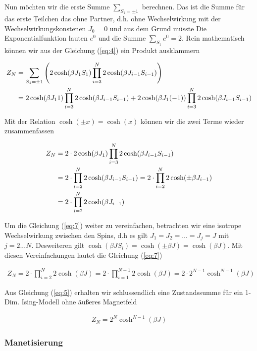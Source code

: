 Nun möchten wir die erste Summe \(\sum_{S_1=\pm 1}\) berechnen. Das ist die Summe für das erste Teilchen das ohne Partner, d.h. ohne Wechselwirkung mit der Wechselwirkungskonstenen \(J_0=0\) und aus dem Grund müsste Die Exponentialfunktion lauten \(e^0\) und die Summe \(\sum_{S_1}e^0 = 2\). Rein mathematisch können wir aus der Gleichung (\ref{eq:4}) ein Produkt ausklammern

\begin{align}
  \label{eq:6}
   Z_N &=\sum_{S_1=\pm 1}\left( 2\cosh(\beta J_1 S_1) \prod_{i=3}^N2\cosh( \beta J_{i-1}S_{i-1}) \right) \notag\\
&=2\cosh(\beta J_1 1)\prod_{i=3}^N2\cosh( \beta J_{i-1}S_{i-1}) + 2\cosh(\beta J_1 (-1))\prod_{i=3}^N2\cosh( \beta J_{i-1}S_{i-1})
\end{align}

Mit der Relation  \(\cosh(\pm x) = \cosh(x) \) können wir die zwei Terme wieder zusammenfassen

\begin{align}
  \label{eq:7}
   Z_N &=2\cdot  2\cosh(\beta J_1)\prod_{i=3}^N2\cosh( \beta J_{i-1}S_{i-1})  \notag\\
&=2\cdot\prod_{i=2}^N2\cosh( \beta J_{i-1}S_{i-1}) = 2\cdot\prod_{i=2}^N2\cosh(\pm \beta J_{i-1}) \notag\\
&=  2\cdot\prod_{i=2}^N2\cosh(\beta J_{i-1})
\end{align}

Um die Gleichung (\ref{eq:7}) weiter zu vereinfachen, betrachten wir eine isotrope Wechselwirkung zwischen den Spins, d.h es gilt \(J_1=J_2=\dots=J_j=J\) mit \(j=2...N\). Desweiteren gilt \(\cosh(\beta J S_i ) = \cosh(\pm \beta J) =  \cosh(\beta J) \). Mit diesen Vereinfachungen lautet die Gleichung (\ref{eq:7})

\begin{align}
  \label{eq:5}
   Z_N =2\cdot \prod_{i=2}^N2\cosh( \beta J ) = 2\cdot \prod_{i=1}^{N-1}2\cosh( \beta J ) = 2\cdot 2^{N-1}\cosh^{N-1}( \beta J ) 
\end{align}

Aus Gleichung (\ref{eq:5}) erhalten wir schlussendlich eine Zustandssumme für ein 1-Dim. Ising-Modell ohne äußeres Magnetfeld

\begin{align}
  \label{eq:8}
  \boxed{Z_N = 2^{N}\cosh^{N-1}( \beta J )  }
\end{align}

\subsubsection*{Manetisierung}

